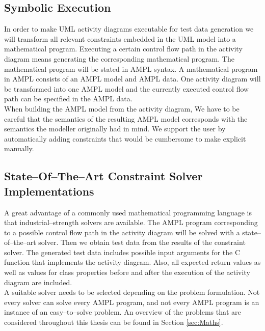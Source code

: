 \subsection{Symbolic Execution}
In order to make UML activity diagrams executable for test data generation we will transform all relevant constraints embedded in the UML model into a mathematical program. Executing a certain control flow path in the activity diagram means generating the corresponding mathematical program. The mathematical program will be stated in AMPL syntax. A mathematical program in AMPL consists of an AMPL model and AMPL data. One activity diagram will be transformed into one AMPL model and the currently executed control flow path can be specified in the AMPL data.\\
When building the AMPL model from the activity diagram, We have to be careful that the semantics of the resulting AMPL model corresponds with the semantics the modeller originally had in mind. We support the user by automatically adding constraints that would be cumbersome to make explicit manually.
\subsection{State--Of--The--Art Constraint Solver Implementations} 
A great advantage of a commonly used mathematical programming language is that industrial--strength solvers are available. The AMPL program corresponding to a possible control flow path in the activity diagram will be solved with a state--of--the--art solver. Then we obtain test data from the results of the constraint solver. The generated test data includes possible input arguments for the C function that implements the activity diagram. Also, all expected return values as well as values for class properties before and after the execution of the activity diagram are included.\\
A suitable solver needs to be selected depending on the problem formulation. Not every solver can solve every AMPL program, and not every AMPL program is an instance of an easy--to--solve problem. An overview of the problems that are considered throughout this thesis can be found in Section \ref{sec:Maths}.
